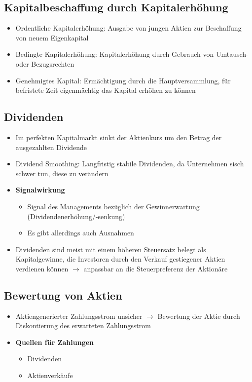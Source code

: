 \subsection{Kapitalbeschaffung durch Kapitalerhöhung}
\begin{itemize}
	\item Ordentliche Kapitalerhöhung: Ausgabe von jungen Aktien zur Beschaffung von neuem Eigenkapital
	\item Bedingte Kapitalerhöhung: Kapitalerhöhung durch Gebrauch von Umtausch- oder Bezugsrechten
	\item Genehmigtes Kapital: Ermächtigung durch die Hauptversammlung, für befristete Zeit eigenmächtig das Kapital erhöhen zu können
\end{itemize}


\subsection{Dividenden}
\begin{itemize}
	\item Im perfekten Kapitalmarkt sinkt der Aktienkurs um den Betrag der ausgezahlten Dividende
	\item Dividend Smoothing: Langfristig stabile Dividenden, da Unternehmen sisch schwer tun, diese zu verändern
	\item \textbf{Signalwirkung}
	\begin{itemize}
		\item Signal des Managements bezüglich der Gewinnerwartung (Dividendenerhöhung/-senkung)
		\item Es gibt allerdings auch Ausnahmen
	\end{itemize}
	\item Dividenden sind meist mit einem höheren Steuersatz belegt als Kapitalgewinne, die Investoren durch den Verkauf gestiegener Aktien verdienen können $\rightarrow$ anpassbar an die Steuerpreferenz der Aktionäre
\end{itemize}


\subsection{Bewertung von Aktien}
\begin{itemize}
	\item Aktiengenerierter Zahlungsstrom unsicher $\rightarrow$ Bewertung der Aktie durch Diskontierung des erwarteten Zahlungsstrom
	\item \textbf{Quellen für Zahlungen}
	\begin{itemize}
		\item Dividenden
		\item Aktienverkäufe
	\end{itemize}
\end{itemize}



